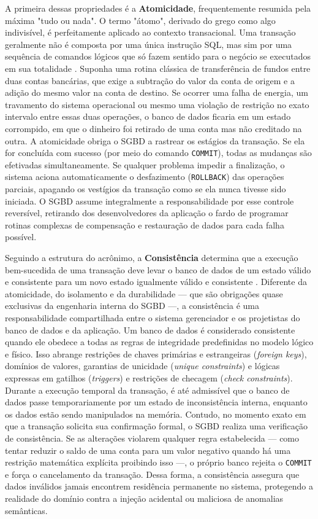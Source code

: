 A primeira dessas propriedades é a \textbf{Atomicidade}, frequentemente resumida pela máxima "tudo ou nada". O termo "átomo", derivado do grego como algo indivisível, é perfeitamente aplicado ao contexto transacional. Uma transação geralmente não é composta por uma única instrução SQL, mas sim por uma sequência de comandos lógicos que só fazem sentido para o negócio se executados em sua totalidade \cite{silberschatz2020sistemas}. Suponha uma rotina clássica de transferência de fundos entre duas contas bancárias, que exige a subtração do valor da conta de origem e a adição do mesmo valor na conta de destino. Se ocorrer uma falha de energia, um travamento do sistema operacional ou mesmo uma violação de restrição no exato intervalo entre essas duas operações, o banco de dados ficaria em um estado corrompido, em que o dinheiro foi retirado de uma conta mas não creditado na outra. A atomicidade obriga o SGBD a rastrear os estágios da transação. Se ela for concluída com sucesso (por meio do comando \texttt{COMMIT}), todas as mudanças são efetivadas simultaneamente. Se qualquer problema impedir a finalização, o sistema aciona automaticamente o desfazimento (\texttt{ROLLBACK}) das operações parciais, apagando os vestígios da transação como se ela nunca tivesse sido iniciada. O SGBD assume integralmente a responsabilidade por esse controle reversível, retirando dos desenvolvedores da aplicação o fardo de programar rotinas complexas de compensação e restauração de dados para cada falha possível.

Seguindo a estrutura do acrônimo, a \textbf{Consistência} determina que a execução bem-sucedida de uma transação deve levar o banco de dados de um estado válido e consistente para um novo estado igualmente válido e consistente \cite{elmasri2011sistemas}. Diferente da atomicidade, do isolamento e da durabilidade --- que são obrigações quase exclusivas da engenharia interna do SGBD ---, a consistência é uma responsabilidade compartilhada entre o sistema gerenciador e os projetistas do banco de dados e da aplicação. Um banco de dados é considerado consistente quando ele obedece a todas as regras de integridade predefinidas no modelo lógico e físico. Isso abrange restrições de chaves primárias e estrangeiras (\textit{foreign keys}), domínios de valores, garantias de unicidade (\textit{unique constraints}) e lógicas expressas em gatilhos (\textit{triggers}) e restrições de checagem (\textit{check constraints}). Durante a execução temporal da transação, é até admissível que o banco de dados passe temporariamente por um estado de inconsistência interna, enquanto os dados estão sendo manipulados na memória. Contudo, no momento exato em que a transação solicita sua confirmação formal, o SGBD realiza uma verificação de consistência. Se as alterações violarem qualquer regra estabelecida --- como tentar reduzir o saldo de uma conta para um valor negativo quando há uma restrição matemática explícita proibindo isso ---, o próprio banco rejeita o \texttt{COMMIT} e força o cancelamento da transação. Dessa forma, a consistência assegura que dados inválidos jamais encontrem residência permanente no sistema, protegendo a realidade do domínio contra a injeção acidental ou maliciosa de anomalias semânticas.

